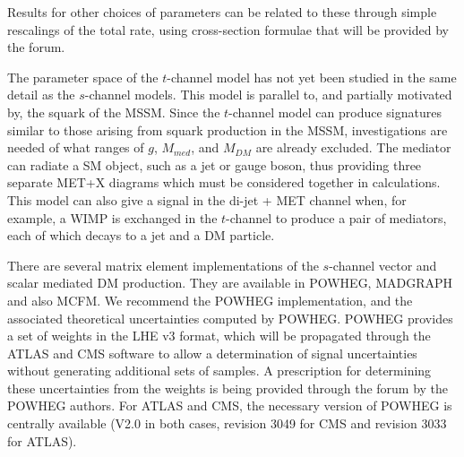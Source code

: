 \documentclass[a4,debug,notitlepage,nobib]{tufte-handout}
\begin{document}

Results for other choices of parameters can be related to
these through simple rescalings of the total rate, using cross-section
formulae that will be provided by the forum.

The parameter space of the $t$-channel model 
has not yet been studied in the same detail as the
$s$-channel models. 
This model is parallel to, and partially motivated by, the
squark of the MSSM. Since the $t$-channel model can produce signatures 
similar to those arising from squark production in the MSSM, investigations 
are needed of what ranges of $g$, $M_{med}$, and $M_{DM}$ are already excluded.
The mediator can radiate a SM object, such as a jet or gauge boson, 
thus providing three separate MET+X diagrams which must be considered together in
calculations. This model can also give a signal in the di-jet + MET
channel when, for example, a WIMP is exchanged in the $t$-channel to
produce a pair of mediators, each of which decays to a jet and a DM particle.


There are several matrix element implementations of the $s$-channel
vector and scalar mediated DM production.
They are available in POWHEG, MADGRAPH
and also MCFM. We recommend the POWHEG implementation, 
and the associated theoretical uncertainties 
computed by POWHEG. 
POWHEG provides a set
of weights in the LHE v3 format, which will be propagated through the
ATLAS and CMS software to allow a determination of signal uncertainties
without generating additional sets of samples. A prescription for
determining these uncertainties from the weights is being provided
through the forum by the POWHEG authors.
For ATLAS and CMS, the necessary version of POWHEG is centrally available 
(V2.0 in both cases, revision 3049 for CMS and revision 3033 for ATLAS).
\end{document}
